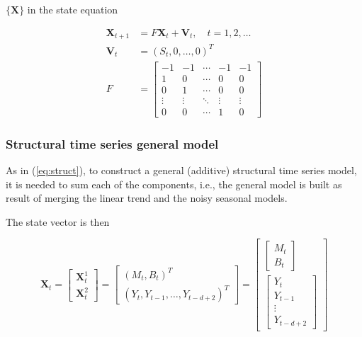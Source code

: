 $\{\bm{X}\}$ in the state equation

\begin{align}
	\bm{X}_{t+1} &= F\bm{X}_t + \bm{V}_t , \quad t=1,2,\dots\\
	\bm{V}_t &= (S_t, 0, \ldots, 0)^T \label{eq:V_noise} \\
	F &= 
	\begin{bmatrix}
		-1		& -1		& \cdots	& -1		& -1 		\\
		 1		&  0 		& \cdots 	&  0		& 0  		\\
		 0		&  1 		& \cdots 	&  0		& 0  		\\
		\vdots	& \vdots	& \ddots	& \vdots	& \vdots	\\
		0		&  0		& \cdots 	&  1		& 0		
	\end{bmatrix}\label{eq:F_noise}
\end{align}



\subsubsection*{Structural time series general model}

As in (\ref{eq:struct}), to construct a general (additive) structural time series model, it is needed to sum each of the components, i.e., the general model is built as result of merging the linear trend and the noisy seasonal models.

The state vector is then

\begin{equation}
	\bm{X}_t = 
	\begin{bmatrix}
		\bm{X}_t^1 \\
		\bm{X}_t^2
	\end{bmatrix} =
	\begin{bmatrix}
		(M_t, B_t)^T \\
		(Y_t, Y_{t-1}, \ldots, Y_{t-d+2})^T
	\end{bmatrix} = 
	\begin{bmatrix}
		\begin{bmatrix}
			M_t \\
			B_t
		\end{bmatrix} \\
		\begin{bmatrix}
			Y_t \\
			Y_{t-1} \\
			\vdots \\
			Y_{t-d+2}
		\end{bmatrix}
	\end{bmatrix}
\end{equation}

